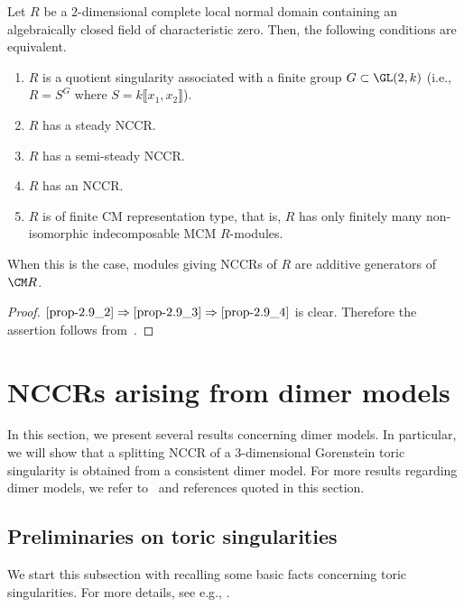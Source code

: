\begin{prop}\label{twodim}
Let $R$ be a $2$-dimensional complete local normal domain containing an algebraically closed field of characteristic zero. Then, the following conditions are equivalent.
\begin{enumerate}%
\item\label{prop-2.9_1} $R$ is a quotient singularity associated with a finite group $G\subset\GL(2, k)$ (i.e., $R=S^G$ where $S=k\llbracket x_1, x_2\rrbracket $).
\item\label{prop-2.9_2} $R$ has a steady NCCR.
\item\label{prop-2.9_3} $R$ has a semi-steady NCCR.
\item\label{prop-2.9_4} $R$ has an NCCR.
\item\label{prop-2.9_5} $R$ is of finite CM representation type, that is, $R$ has only finitely many non-isomorphic indecomposable MCM $R$-modules.
\end{enumerate}
When this is the case, modules giving NCCRs of $R$ are additive generators of $\CM R$.
\end{prop}

\begin{proof}
$\eqref{prop-2.9_2}\Rightarrow\eqref{prop-2.9_3}\Rightarrow\eqref{prop-2.9_4}$ is clear. Therefore the assertion follows from~\cite[Proposition~4.2]{IN}.
\end{proof}


\section{NCCRs arising from dimer models}\label{NCCR_via_dimer}

In this section, we present several results concerning dimer models. In particular, we will show that a splitting NCCR of a $3$-dimensional Gorenstein toric singularity is obtained from a consistent dimer model. For more results regarding dimer models, we refer to~\cite{Boc4} and references quoted in this section.

\subsection{Preliminaries on toric singularities}\label{toric_pre}
We start this subsection with recalling some basic facts concerning toric singularities. For more details, see e.g., \cite{BG2,CLS}.

